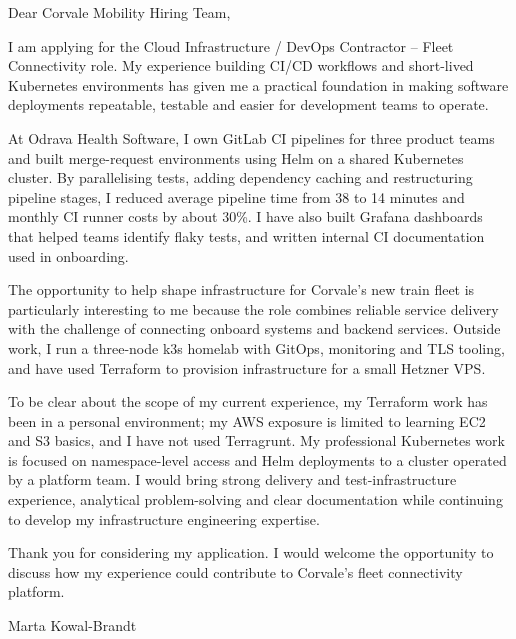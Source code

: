 \documentclass[11pt,a4paper]{article}
\begin{document}
Dear Corvale Mobility Hiring Team,

I am applying for the Cloud Infrastructure / DevOps Contractor -- Fleet Connectivity role. My experience building CI/CD workflows and short-lived Kubernetes environments has given me a practical foundation in making software deployments repeatable, testable and easier for development teams to operate.

At Odrava Health Software, I own GitLab CI pipelines for three product teams and built merge-request environments using Helm on a shared Kubernetes cluster. By parallelising tests, adding dependency caching and restructuring pipeline stages, I reduced average pipeline time from 38 to 14 minutes and monthly CI runner costs by about 30\%. I have also built Grafana dashboards that helped teams identify flaky tests, and written internal CI documentation used in onboarding.

The opportunity to help shape infrastructure for Corvale's new train fleet is particularly interesting to me because the role combines reliable service delivery with the challenge of connecting onboard systems and backend services. Outside work, I run a three-node k3s homelab with GitOps, monitoring and TLS tooling, and have used Terraform to provision infrastructure for a small Hetzner VPS.

To be clear about the scope of my current experience, my Terraform work has been in a personal environment; my AWS exposure is limited to learning EC2 and S3 basics, and I have not used Terragrunt. My professional Kubernetes work is focused on namespace-level access and Helm deployments to a cluster operated by a platform team. I would bring strong delivery and test-infrastructure experience, analytical problem-solving and clear documentation while continuing to develop my infrastructure engineering expertise.

Thank you for considering my application. I would welcome the opportunity to discuss how my experience could contribute to Corvale's fleet connectivity platform.

Marta Kowal-Brandt
\end{document}
